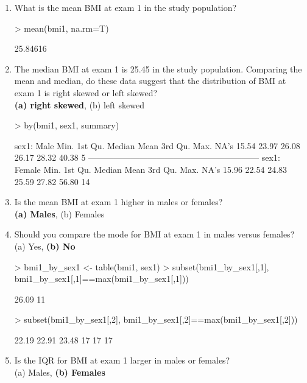 \documentclass{article}
\begin{document}
\begin{enumerate}
  \item What is the mean BMI at exam 1 in the study population?

\begin{Schunk}
\begin{Sinput}
> mean(bmi1, na.rm=T)
\end{Sinput}
\begin{Soutput}
[1] 25.84616
\end{Soutput}
\end{Schunk}

\item The median BMI at exam 1 is 25.45 in the study population.  Comparing the mean and median, do these data suggest that the distribution of BMI at exam 1 is right skewed or left skewed?\\
\textbf{(a) right skewed},  (b) left skewed

\begin{Schunk}
\begin{Sinput}
> by(bmi1, sex1, summary)
\end{Sinput}
\begin{Soutput}
sex1: Male
   Min. 1st Qu.  Median    Mean 3rd Qu.    Max.    NA's 
  15.54   23.97   26.08   26.17   28.32   40.38       5 
------------------------------------------------------------ 
sex1: Female
   Min. 1st Qu.  Median    Mean 3rd Qu.    Max.    NA's 
  15.96   22.54   24.83   25.59   27.82   56.80      14 
\end{Soutput}
\end{Schunk}

\item Is the mean BMI at exam 1 higher in males or females?\\
\textbf{(a) Males},  (b) Females

\item Should you compare the mode for BMI at exam 1 in males versus females?\\
(a) Yes, \textbf{(b) No}
\begin{Schunk}
\begin{Sinput}
> bmi1_by_sex1 <- table(bmi1, sex1) 
> subset(bmi1_by_sex1[,1], bmi1_by_sex1[,1]==max(bmi1_by_sex1[,1])) 
\end{Sinput}
\begin{Soutput}
26.09 
   11 
\end{Soutput}
\begin{Sinput}
> subset(bmi1_by_sex1[,2], bmi1_by_sex1[,2]==max(bmi1_by_sex1[,2]))
\end{Sinput}
\begin{Soutput}
22.19 22.91 23.48 
   17    17    17 
\end{Soutput}
\end{Schunk}
\pagebreak
\item Is the IQR for BMI at exam 1 larger in males or females?\\
(a) Males, \textbf{(b) Females}


\end{enumerate}
\end{document}
